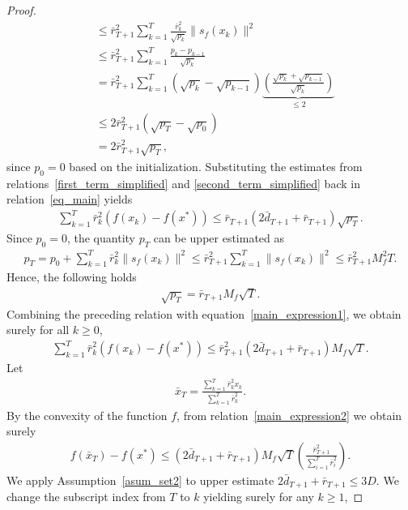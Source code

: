 \documentclass{article}
\theoremstyle{plain}
\theoremstyle{definition}
\theoremstyle{remark}
\begin{document}
\begin{proof}
\begin{align}
&\le \bar{r}_{T+1}^2 \sum_{k=1}^{T} \frac{\bar{r}_k^2}{\sqrt{p_k}} \| s_f(x_k) \|^2 \nonumber\\
&\le \bar{r}_{T+1}^2 \sum_{k=1}^{T} \frac{p_k - p_{k-1}}{\sqrt{p_k}} \nonumber\\
& = \bar{r}_{T+1}^2 \sum_{k=1}^{T} \left( \sqrt{p_k} - \sqrt{p_{k-1}} \right) \underbrace{\left( \frac{\sqrt{p_k} + \sqrt{p_{k-1}}}{\sqrt{p_k}} \right)}_{\leq 2} \nonumber\\
& \leq 2 \bar{r}_{T+1}^2 \left( \sqrt{p_{T}} - \sqrt{p_{0}} \right) \nonumber\\
& = 2 \bar{r}_{T+1}^2 \sqrt{p_{T}} , \label{second_term_simplified}
\end{align}
since $p_{0} = 0$ based on the initialization. Substituting the estimates from relations~\eqref{first_term_simplified} and \eqref{second_term_simplified} back in relation~\eqref{eq_main} yields
\begin{align}
    \sum_{k=1}^{T} \bar{r}_k^2 \left( f(x_k) - f(x^*) \right)
    \leq \bar r_{T+1} ( 2\bar d_{T+1} + \bar r_{T+1}) \sqrt{p_{T}} . \label{main_expression1}
\end{align}
Since $p_0 = 0$, the quantity $p_{T}$ can be upper estimated as
\begin{align}
    p_{T} = p_0 + \sum_{k=1}^{T} \bar{r}_k^2 \| s_f(x_k) \|^2
    \le \bar{r}_{T+1}^2 \sum_{k=1}^{T} \| s_f(x_k) \|^2 
    \le \bar{r}_{T+1}^2 M_f^2 T . \nonumber
\end{align}
Hence, the following holds
\begin{align}
    \sqrt{p_{T}} = \bar{r}_{T+1} M_f \sqrt{T} . \nonumber
\end{align}
Combining the preceding relation with equation~\eqref{main_expression1}, we obtain surely for all $k \geq 0$,
\begin{align}
    \sum_{k=1}^{T} \bar{r}_k^2 \left( f(x_k) - f(x^*) \right) \leq \bar r_{T+1}^2 (2\bar d_{T+1} + \bar r_{T+1}) M_f \sqrt{T} . \label{main_expression2}
\end{align}
Let
\begin{align*}
    \bar x_T = \frac{\sum_{k=1}^T \bar r_k^2 x_k}{\sum_{k=1}^T \bar r_k^2} . 
\end{align*}
By the convexity of the function $f$, from relation~\eqref{main_expression2} we obtain surely
\begin{align*}
    f(\bar{x}_T) - f(x^*) \leq (2\bar d_{T+1} + \bar r_{T+1}) M_f \sqrt{T} \left(\frac{\bar r_{T+1}^2}{\sum_{i=1}^T \bar r_i^2} \right) .
\end{align*}
We apply Assumption~\ref{asum_set2} to upper estimate $2 \bar d_{T+1} + \bar r_{T+1} \leq 3D$. We change the subscript index from $T$ to $k$ yielding surely for any $k \geq 1$,

\end{proof}
\end{document}
